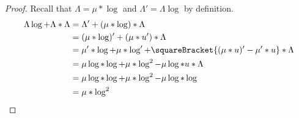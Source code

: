 \begin{proof}
    Recall that \(\Lambda = \mu \ast \log\) and \(\Lambda' = \Lambda \log\) by definition.
    \begin{align*}
        \Lambda \log + \Lambda \ast \Lambda &= \Lambda' + (\mu \ast \log) \ast \Lambda\\
        &= (\mu \ast \log)' + (\mu \ast u')\ast \Lambda\\
        &= \mu' \ast \log + \mu \ast \log' + \squareBracket{(\mu \ast u)' - \mu' \ast u} \ast \Lambda\\
        &= \mu \log \ast \log + \mu \ast \log^2 - \mu\log \ast u \ast \Lambda\\
        &= \mu \log \ast \log + \mu \ast \log^2 - \mu\log \ast \log\\
        &= \mu \ast \log^2 \\
    \end{align*}
\end{proof}

